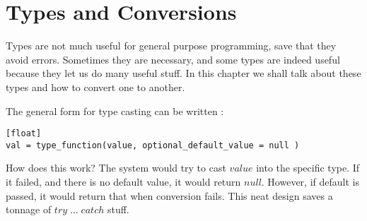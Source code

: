 \chapter{Types and Conversions}\label{type-conversions}

{\LARGE T}ypes are not much useful for general purpose programming, save that they avoid errors.
Sometimes they are necessary, and some types are indeed useful because they let us do 
many useful stuff. In this chapter we shall talk about these types and how to convert
one to another.

The general form for type casting can be written :
\begin{lstlisting}[style=JexlStyle][float]
val = type_function(value, optional_default_value = null )
\end{lstlisting}

How does this work? The system would try to cast $value$
into the specific type. If it failed, and there is no default value, 
it would return $null$. However, if default is passed, it would return 
that when conversion fails.
This neat design saves a tonnage of $try \; ... \; catch$ stuff. 

